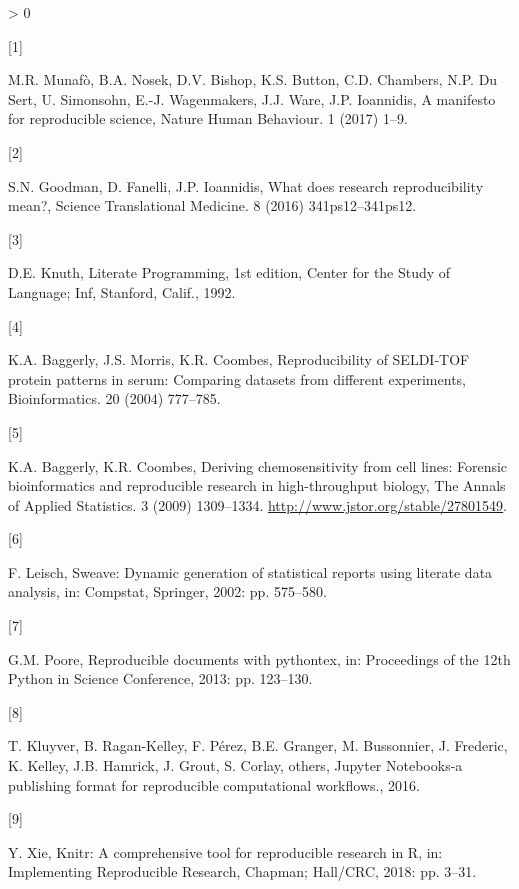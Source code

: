 \documentclass[]{elsarticle} %
\newlength{\csllabelwidth}
\newlength{\cslhangindent}
\newenvironment{CSLReferences}[3] %
 {%
  \setlength{\parindent}{0pt}
  \ifodd #1 \everypar{\setlength{\hangindent}{\cslhangindent}}\ignorespaces\fi
  \ifnum #2 > 0
  \setlength{\parskip}{#2\baselineskip}
  \fi
 }%
 {}
\newcommand{\CSLLeftMargin}[1]{\parbox[t]{\csllabelwidth}{#1}}
\newcommand{\CSLRightInline}[1]{\parbox[t]{\linewidth - \csllabelwidth}{#1}}
\begin{document}
\hypertarget{refs}{}
\begin{CSLReferences}{0}{0}
\leavevmode\hypertarget{ref-munafo2017manifesto}{}%
\CSLLeftMargin{{[}1{]} }
\CSLRightInline{M.R. Munafò, B.A. Nosek, D.V. Bishop, K.S. Button, C.D.
Chambers, N.P. Du Sert, U. Simonsohn, E.-J. Wagenmakers, J.J. Ware, J.P.
Ioannidis, A manifesto for reproducible science, Nature Human Behaviour.
1 (2017) 1--9.}

\leavevmode\hypertarget{ref-goodman2016does}{}%
\CSLLeftMargin{{[}2{]} }
\CSLRightInline{S.N. Goodman, D. Fanelli, J.P. Ioannidis, What does
research reproducibility mean?, Science Translational Medicine. 8 (2016)
341ps12--341ps12.}

\leavevmode\hypertarget{ref-knuth_literate_1992}{}%
\CSLLeftMargin{{[}3{]} }
\CSLRightInline{D.E. Knuth, Literate {Programming}, 1st edition, Center
for the Study of Language; Inf, Stanford, Calif., 1992.}

\leavevmode\hypertarget{ref-baggerly2004reproducibility}{}%
\CSLLeftMargin{{[}4{]} }
\CSLRightInline{K.A. Baggerly, J.S. Morris, K.R. Coombes,
Reproducibility of SELDI-TOF protein patterns in serum: Comparing
datasets from different experiments, Bioinformatics. 20 (2004)
777--785.}

\leavevmode\hypertarget{ref-Baggerly2009}{}%
\CSLLeftMargin{{[}5{]} }
\CSLRightInline{K.A. Baggerly, K.R. Coombes, Deriving chemosensitivity
from cell lines: Forensic bioinformatics and reproducible research in
high-throughput biology, The Annals of Applied Statistics. 3 (2009)
1309--1334. \url{http://www.jstor.org/stable/27801549}.}

\leavevmode\hypertarget{ref-leisch2002sweave}{}%
\CSLLeftMargin{{[}6{]} }
\CSLRightInline{F. Leisch, Sweave: Dynamic generation of statistical
reports using literate data analysis, in: Compstat, Springer, 2002: pp.
575--580.}

\leavevmode\hypertarget{ref-poore2013reproducible}{}%
\CSLLeftMargin{{[}7{]} }
\CSLRightInline{G.M. Poore, Reproducible documents with pythontex, in:
Proceedings of the 12th Python in Science Conference, 2013: pp.
123--130.}

\leavevmode\hypertarget{ref-kluyver2016jupyter}{}%
\CSLLeftMargin{{[}8{]} }
\CSLRightInline{T. Kluyver, B. Ragan-Kelley, F. Pérez, B.E. Granger, M.
Bussonnier, J. Frederic, K. Kelley, J.B. Hamrick, J. Grout, S. Corlay,
others, {J}upyter {N}otebooks-a publishing format for reproducible
computational workflows., 2016.}

\leavevmode\hypertarget{ref-xie2018knitr}{}%
\CSLLeftMargin{{[}9{]} }
\CSLRightInline{Y. Xie, Knitr: A comprehensive tool for reproducible
research in {R}, in: Implementing Reproducible Research, Chapman;
Hall/CRC, 2018: pp. 3--31.}


\end{CSLReferences}
\end{document}
